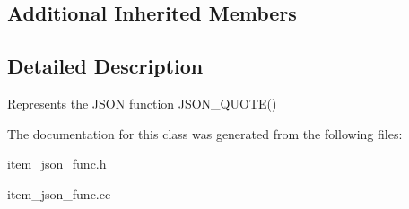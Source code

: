 \subsection*{Additional Inherited Members}


\subsection{Detailed Description}
Represents the J\+S\+ON function J\+S\+O\+N\+\_\+\+Q\+U\+O\+T\+E() 

The documentation for this class was generated from the following files\+:\begin{DoxyCompactItemize}
\item 
item\+\_\+json\+\_\+func.\+h\item 
item\+\_\+json\+\_\+func.\+cc\end{DoxyCompactItemize}
